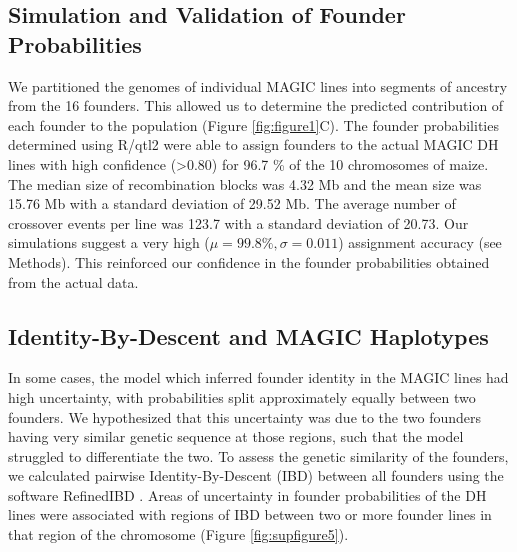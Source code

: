 \documentclass[9pt,twocolumn,twoside]{gsag3jnl}
\begin{document}
\subsection{Simulation and Validation of Founder Probabilities}

We partitioned the genomes of individual MAGIC lines into segments of ancestry from the 16 founders.
This allowed us to determine the predicted contribution of each founder to the population (Figure \ref{fig:figure1}C).
The founder probabilities determined using R/qtl2 were able to assign founders to the actual MAGIC DH lines with high confidence (>0.80) for  96.7 \% of the 10 chromosomes of maize.
The median size of recombination blocks was 4.32 Mb and the mean size was 15.76 Mb with a standard deviation of 29.52 Mb.
The average number of crossover events per line was 123.7 with a standard deviation of 20.73.
Our simulations suggest a very high ($\mu = 99.8\%, \sigma =0.011$) assignment accuracy (see Methods).
This reinforced our confidence in the founder probabilities obtained from the actual data.

\subsection{Identity-By-Descent and MAGIC Haplotypes}
In some cases, the model which inferred founder identity in the MAGIC lines had high uncertainty, with probabilities split approximately equally between two founders.
We hypothesized that this uncertainty was due to the two founders having very similar genetic sequence at those regions, such that the model struggled to differentiate the two.
To assess the genetic similarity of the founders, we calculated pairwise Identity-By-Descent (IBD) between all founders using the software RefinedIBD \citep{Browning}.
Areas of uncertainty in founder probabilities of the DH lines were associated with regions of IBD between two or more founder lines in that region of the chromosome (Figure \ref{fig:supfigure5}).
\end{document}
